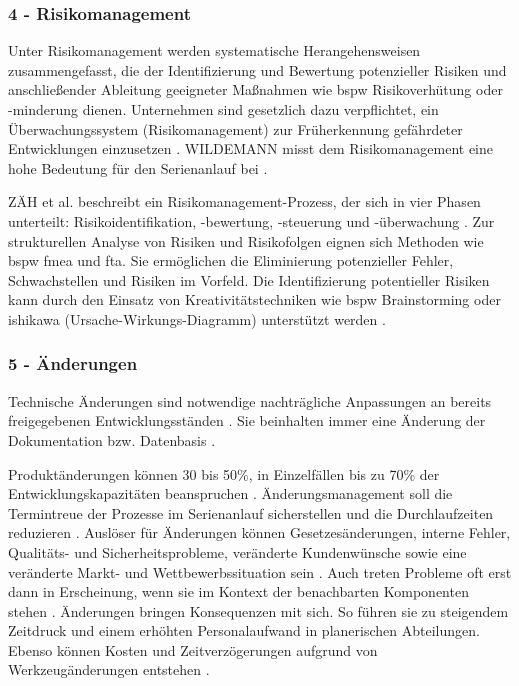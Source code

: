 \subsubsection*{4 - Risikomanagement}
Unter Risikomanagement werden systematische Herangehensweisen zusammengefasst, die der Identifizierung und Bewertung potenzieller Risiken und anschließender Ableitung geeigneter Maßnahmen wie \gls{bspw} Risikoverhütung oder -minderung dienen. %
Unternehmen sind gesetzlich dazu verpflichtet, ein Überwachungssystem (Risikomanagement) zur Früherkennung gefährdeter Entwicklungen einzusetzen \cite[302]{Burghardt2006}.
WILDEMANN misst dem Risikomanagement eine hohe Bedeutung für den Serienanlauf bei \cite{Wildemann2004}. 

ZÄH et al. beschreibt ein Risikomanagement-Prozess, der sich in vier Phasen unterteilt: Risikoidentifikation, -bewertung, -steuerung und -überwachung \cite{Zaeh2004}. 
Zur strukturellen Analyse von Risiken und Risikofolgen eignen sich  Methoden wie \gls{bspw} \gls{fmea} und \gls{fta}. Sie ermöglichen die Eliminierung potenzieller Fehler, Schwachstellen und Risiken im Vorfeld.
Die Identifizierung potentieller Risiken kann durch den Einsatz von Kreativitätstechniken wie \gls{bspw} Brainstorming oder \gls{ishikawa} (Ursache-Wirkungs-Diagramm) unterstützt werden \cite[41]{Bischoff2007}. 

\subsubsection*{5 - Änderungen}

Technische Änderungen sind notwendige nachträgliche Anpassungen an bereits freigegebenen Entwicklungsständen \cite{Zanner2002}. Sie beinhalten immer eine Änderung der Dokumentation bzw. Datenbasis \cite[47]{Niemerg1997}. 	

Produktänderungen können 30 bis 50\%, in Einzelfällen bis zu 70\% der Entwicklungskapazitäten beanspruchen \cite[2]{Lindemann1998}.
Änderungsmanagement soll die Termintreue der Prozesse im Serienanlauf sicherstellen und die Durchlaufzeiten reduzieren \cite[216]{Schuh2008}. 
Auslöser für Änderungen können Gesetzesänderungen, interne Fehler, Qualitäts- und Sicherheitsprobleme, veränderte Kundenwünsche sowie eine veränderte Markt- und Wettbewerbssituation sein \cite{Zanner2002}. Auch treten Probleme oft erst dann in Erscheinung, wenn sie im Kontext der benachbarten Komponenten stehen \cite[24]{Kuhn2002}.
Änderungen bringen Konsequenzen mit sich. So führen sie zu steigendem Zeitdruck und einem erhöhten Personalaufwand in planerischen Abteilungen. Ebenso können Kosten und Zeitverzögerungen aufgrund von Werkzeugänderungen entstehen \cite[24]{Kuhn2002}. 

